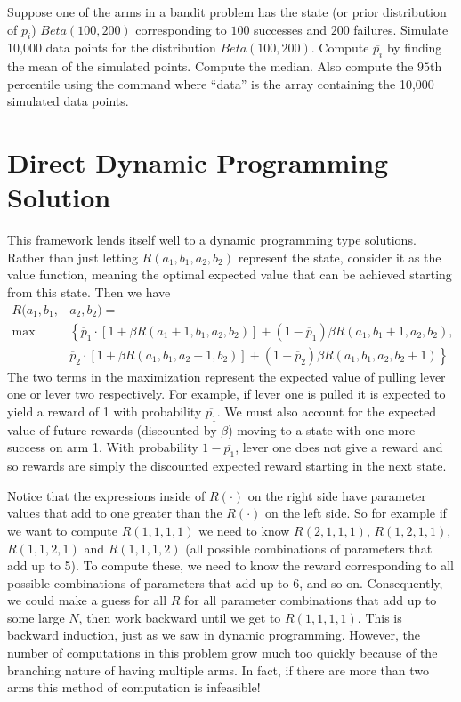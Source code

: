 \begin{problem}
Suppose one of the arms in a bandit problem has the state (or prior distribution of $p_i$) 
$Beta(100,200)$ corresponding to $100$ successes and $200$ failures.  
Simulate 10,000 data points for the distribution $Beta(100,200)$.  
Compute $\overline{p_i}$ by finding the mean of the simulated points. 
Compute the median.  Also compute the $95$th percentile using the command 
 where ``data'' is the array 
containing the 10,000 simulated data points.
\end{problem}

\section*{Direct Dynamic Programming Solution}
This framework lends itself well to a dynamic programming type solutions.  
Rather than just letting $R(a_1,b_1,a_2,b_2)$ represent the state, consider 
it as the value function, meaning the optimal expected value that can be achieved 
starting from this state.  Then we have
\begin{equation}
\label{recurs}
\begin{aligned}
R(a_1,b_1,&a_2,b_2) =\\
 \max&\left\{\overline{p}_1\cdot[1 + \beta R(a_1+1,b_1,a_2,b_2)] + (1-\overline{p}_1)\beta R(a_1,b_1+1,a_2,b_2)\right. ,\\
&  \left.\overline{p}_2\cdot[1 + \beta R(a_1,b_1,a_2+1,b_2)] + (1-\overline{p}_2)\beta R(a_1,b_1,a_2,b_2+1)\right\}
\end{aligned}
\end{equation}
The two terms in the maximization represent the expected value of pulling lever 
one or lever two respectively.  For example, if lever one is pulled it is expected 
to yield a reward of 1 with probability $\overline{p_1}$.  
We must also account for the expected value of future rewards 
(discounted by $\beta$) moving to a state with one more success on arm 1.  
With probability $1-\overline{p_1}$, lever one does not give a reward and so 
rewards are simply the discounted expected reward starting in the next state.

Notice that the expressions inside of $R(\cdot)$ on the right side have parameter 
values that add to one greater than the $R(\cdot)$ on the left side.  
So for example if we want to compute $R(1,1,1,1)$ we need to know 
$R(2,1,1,1)$, $R(1,2,1,1)$, $R(1,1,2,1)$ and $R(1,1,1,2)$ 
(all possible combinations of parameters that add up to 5).  
To compute these, we need to know the reward corresponding to all possible 
combinations of parameters that add up to 6, and so on.  Consequently, we could 
make a guess for all $R$ for all parameter combinations that add up to some large $N$, 
then work backward until we get to $R(1,1,1,1)$.  This is backward induction, 
just as we saw in dynamic programming.  However, the number of computations in this 
problem grow much too quickly because of the branching nature of having multiple arms.  
In fact, if there are more than two arms this method of computation is infeasible!


